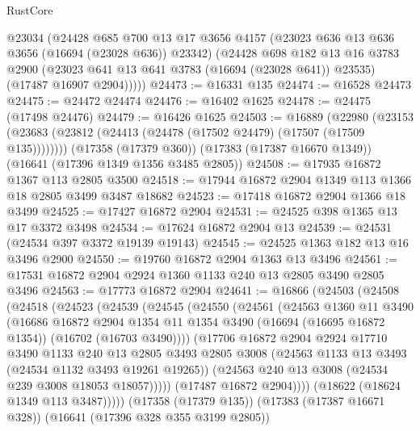\begin{lexlean}{RustCore}
\begin{coremodule}
        @23034
        (@24428
          @685
          @700
          @13
          @17
          @3656
          @4157
          (@23023 @636 @13 @636 @3656 (@16694 (@23028 @636)) @23342)
          (@24428
            @698
            @182
            @13
            @16
            @3783
            @2900
            (@23023 @641 @13 @641 @3783 (@16694 (@23028 @641)) @23535)
            (@17487 @16907 @2904)))))
@24473 := @16331 @135
@24474 := @16528 @24473
@24475 := @24472 @24474
@24476 := @16402 @1625
@24478 := @24475 (@17498 @24476)
@24479 := @16426 @1625
@24503 := @16889
    (@22980 (@23153 (@23683 (@23812 (@24413 (@24478 (@17502 @24479) (@17507 (@17509 @135))))))))
    (@17358 (@17379 @360))
    (@17383 (@17387 @16670 @1349))
    (@16641 (@17396 @1349 @1356 @3485 @2805))
@24508 := @17935 @16872 @1367 @113 @2805 @3500
@24518 := @17944 @16872 @2904 @1349 @113 @1366 @18 @2805 @3499 @3487 @18682
@24523 := @17418 @16872 @2904 @1366 @18 @3499
@24525 := @17427 @16872 @2904
@24531 := @24525 @398 @1365 @13 @17 @3372 @3498
@24534 := @17624 @16872 @2904 @13
@24539 := @24531 (@24534 @397 @3372 @19139 @19143)
@24545 := @24525 @1363 @182 @13 @16 @3496 @2900
@24550 := @19760 @16872 @2904 @1363 @13 @3496
@24561 := @17531 @16872 @2904 @2924 @1360 @1133 @240 @13 @2805 @3490 @2805 @3496
@24563 := @17773 @16872 @2904
@24641 := @16866
    (@24503
      (@24508
        (@24518
          (@24523
            (@24539
              (@24545
                (@24550
                  (@24561
                    (@24563
                      @1360
                      @11
                      @3490
                      (@16686
                        @16872
                        @2904
                        @1354
                        @11
                        @1354
                        @3490
                        (@16694 (@16695 @16872 @1354))
                        (@16702 (@16703 @3490))))
                    (@17706
                      @16872
                      @2904
                      @2924
                      @17710
                      @3490
                      @1133
                      @240
                      @13
                      @2805
                      @3493
                      @2805
                      @3008
                      (@24563 @1133 @13 @3493 (@24534 @1132 @3493 @19261 @19265))
                      (@24563 @240 @13 @3008 (@24534 @239 @3008 @18053 @18057)))))
                (@17487 @16872 @2904))))
          (@18622 (@18624 @1349 @113 @3487)))))
    (@17358 (@17379 @135))
    (@17383 (@17387 @16671 @328))
    (@16641 (@17396 @328 @355 @3199 @2805))

\end{coremodule}
\end{lexlean}
